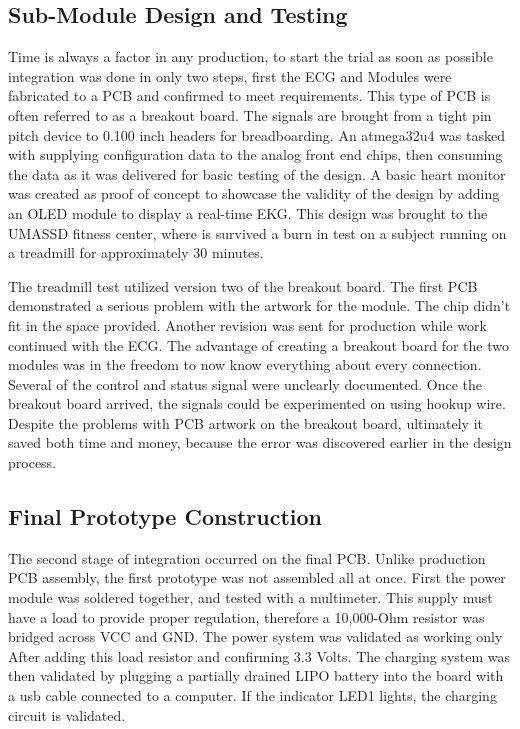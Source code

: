 \subsection {Sub-Module Design and Testing}
Time is always a factor in any production, to start the trial as soon as possible integration was done in only two steps, first the ECG and  Modules were fabricated to a PCB and confirmed to meet requirements. This type of PCB is often referred to as a breakout board. The signals are brought from a tight pin pitch device to 0.100 inch headers for breadboarding. An atmega32u4 was tasked with supplying configuration data to the analog front end chips, then consuming the data as it was delivered for basic testing of the design. A basic heart monitor was created as proof of concept to showcase the validity of the design by adding an OLED module to display a real-time EKG. This design was brought to the UMASSD fitness center, where is survived a burn in test on a subject running on a treadmill for approximately 30 minutes.

The treadmill test utilized version two of the breakout board. The first PCB demonstrated a serious problem with the artwork for the  module. The chip didn't fit in the space provided. Another revision was sent for production while work continued with the ECG. The advantage of creating a breakout board for the two modules was in the freedom to now know everything about every connection. Several of the control and status signal were unclearly documented. Once the breakout board arrived, the signals could be experimented on using hookup wire. Despite the problems with PCB artwork on the breakout board, ultimately it saved both time and money, because the error was discovered earlier in the design process.


\subsection {Final Prototype Construction}
The second stage of integration occurred on the final PCB. Unlike production PCB assembly, the first prototype was not assembled all at once. First the power module was soldered together, and tested with a multimeter. This supply must have a load to provide proper regulation, therefore a 10,000-Ohm resistor was bridged across VCC and GND. The power system was validated as working only After adding this load resistor and confirming 3.3 Volts. The charging system was then validated by plugging a partially drained LIPO battery into the board with a usb cable connected to a computer. If the indicator LED1 lights, the charging circuit is validated. 

